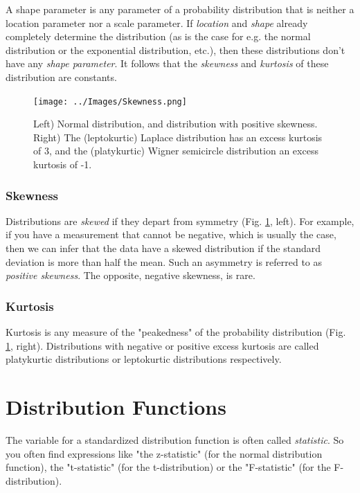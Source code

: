 A shape parameter is any parameter of a probability distribution that is neither a location parameter nor a scale parameter. If \emph{location }and \emph{shape} already completely determine the distribution (as is the case for e.g. the normal distribution or the exponential distribution, etc.), then these distributions don't have any \emph{shape parameter}. It follows that the \emph{skewness }and \emph{kurtosis} of these distribution are constants.

\begin{figure}
  \centering
  \texttt{[image: ../Images/Skewness.png]}\\
  \caption{Left) Normal distribution, and distribution with positive skewness. Right) The (leptokurtic) Laplace distribution has an excess kurtosis of 3, and the (platykurtic) Wigner semicircle distribution an excess kurtosis of -1.}\label{fig:skewkurtosis}
\end{figure}

\subsubsection{Skewness}

Distributions are \emph{skewed} if they depart from symmetry (Fig. \ref{fig:skewkurtosis}, left). For example, if you have a measurement that cannot be negative, which is usually the case, then we can infer that the data have a skewed distribution if the standard deviation is more than half the mean. Such an asymmetry is referred to as \emph{positive skewness}. The opposite, negative skewness, is rare.

\subsubsection{Kurtosis}

Kurtosis is any measure of the "peakedness" of the probability distribution (Fig. \ref{fig:skewkurtosis}, right). Distributions with negative or positive excess kurtosis are called platykurtic distributions or leptokurtic distributions respectively.


\section{Distribution Functions}

The variable for a standardized distribution function is often called \emph{statistic}. So you often find expressions like "the z-statistic" (for the normal distribution function), the "t-statistic" (for the t-distribution) or the "F-statistic" (for the F-distribution).

